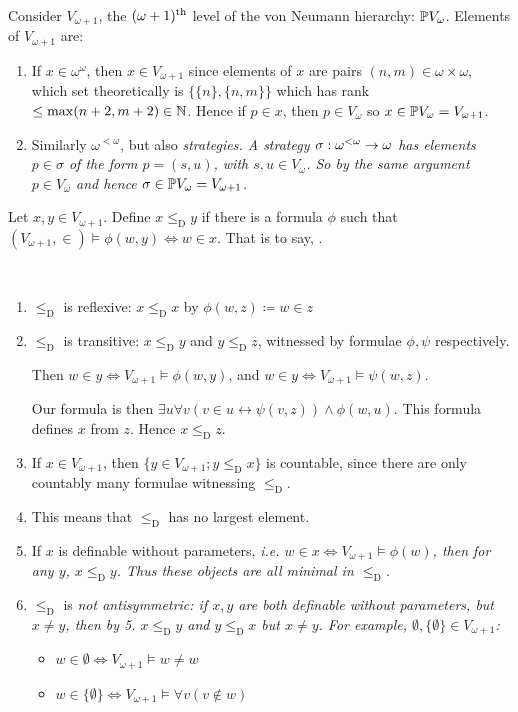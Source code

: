\documentclass[]{article}
\newcommand{\om}{\omega}
\newcommand{\lom}{{<\omega}}
\newcommand{\led}{\le_{\mathrm{D}}}
\begin{document}
Consider $V_{\om+1}$, the $(\om+1)^\th$ level of the von Neumann hierarchy: $\P V_\om$. Elements of $V_{\om+1}$ are:
\begin{enumerate}
    \item If $x \in \om^\om$, then $x \in V_{\om+1}$ since elements of $x$ are pairs $(n,m)\in \om\times\om$, which set theoretically is $\{\{n\},\{n,m\}\}$ which has rank $\le \max(n+2,m+2)\in\mathbb{N}$. Hence if $p \in x$, then $p \in V_\om$ so $x \in \P V_\om = V_{\om+1}$.
    \item Similarly $\om^\lom$, but also \it{strategies}. A strategy $\sigma : \om^\lom \ra \om$ has elements $p \in \sigma$ of the form $p = (s,u)$, with $s,u \in V_\om$. So by the same argument $p \in V_\om$ and hence $\sigma \in \P V_\om = V_{\om+1}$.
\end{enumerate}

\begin{defin*}
    Let $x,y\in V_{\om+1}$. Define $x\led y$ if there is a formula $\phi$ such that $(V_{\om+1},\in)\models \phi(w,y) \iff w \in x$. That is to say, .
\end{defin*}
\begin{remark*}[Properties]\ 
    \begin{enumerate}
        \item $\led$ is reflexive: $x\led x$ by $\phi(w,z)\coloneqq w\in z$
        \item $\led$ is transitive: $x\led y$ and $y\led z$, witnessed by formulae $\phi,\psi$ respectively.
        
        Then $w \in y \iff V_{\om+1}\models \phi(w,y)$, and $w \in y \iff V_{\om+1}\models \psi(w,z)$.

        Our formula is then $\exists u\forall v(v\in u \leftrightarrow \psi(v,z))\land \phi(w,u)$. This formula defines $x$ from $z$. Hence $x\led z$.

        \item If $x \in V_{\om+1}$, then $\{y \in V_{\om+1};y\led x\}$ is countable, since there are only countably many formulae witnessing $\led$.
        \item This means that $\led$ has no largest element.
        \item If $x$ is definable without parameters, \it{i.e.} $w \in x \iff V_{\om+1} \models \phi(w)$, then for any $y$, $x\led y$. Thus these objects are all minimal in $\led$.
        \item $\led$ is \it{not} antisymmetric: if $x,y$ are both definable without parameters, but $x\ne y$, then by 5. $x\led y$ and $y\led x$ but $x\ne y$. For example, $\emptyset,\{\emptyset\}\in V_{\om+1}$:
        \begin{itemize}
            \item $w \in \emptyset \iff V_{\om+1}\models w\ne w$
            \item $w \in \{\emptyset\} \iff V_{\om+1}\models \forall v(v\not\in w)$
        \end{itemize}
    \end{enumerate}
\end{remark*}
\end{document}
